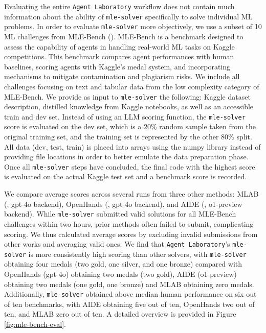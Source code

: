 \documentclass[11pt, a4paper]{gdm_format}
\begin{document}
Evaluating the entire \texttt{Agent Laboratory} workflow does not contain much information about the ability of \texttt{mle-solver} specifically to solve individual ML problems. In order to evaluate \texttt{mle-solver} more objectively, we use a subset of 10 ML challenges from MLE-Bench (\cite{chan2024mle}). MLE-Bench is a benchmark designed to assess the capability of agents in handling real-world ML tasks on Kaggle competitions. This benchmark compares agent performances with human baselines, scoring agents with Kaggle’s medal system, and incorporating mechanisms to mitigate contamination and plagiarism risks. We include all challenges focusing on text and tabular data from the low complexity category of MLE-Bench. We provide as input to \texttt{mle-solver} the following: Kaggle dataset description, distilled knowledge from Kaggle notebooks, as well as an accessible train and dev set. Instead of using an LLM scoring function, the \texttt{mle-solver} score is evaluated on the dev set, which is a 20\% random sample taken from the original training set, and the training set is represented by the other 80\% split. All data (dev, test, train) is placed into arrays using the numpy library instead of providing file locations in order to better emulate the data preparation phase. Once all \texttt{mle-solver} steps have concluded, the final code with the highest score is evaluated on the actual Kaggle test set and a benchmark score is recorded.


We compare average scores across several runs from three other methods: MLAB (\cite{huang2024mlagentbench}, gpt-4o backend), OpenHands (\cite{wang2024opendevin}, gpt-4o backend), and AIDE (\cite{AIDE}, o1-preview backend). While \texttt{mle-solver} submitted valid solutions for all MLE-Bench challenges within two hours, prior methods often failed to submit, complicating scoring. We thus calculated average scores by excluding invalid submissions from other works and averaging valid ones. We find that \texttt{Agent Laboratory}'s \texttt{mle-solver} is more consistently high scoring than other solvers, with \texttt{mle-solver} obtaining four medals (two gold, one silver, and one bronze) compared with OpenHands (gpt-4o) obtaining two medals (two gold), AIDE (o1-preview) obtaining two medals (one gold, one bronze) and MLAB obtaining zero medals. Additionally, \texttt{mle-solver} obtained above median human performance on six out of ten benchmarks, with AIDE obtaining five out of ten, OpenHands two out of ten, and MLAB zero out of ten. A detailed overview is provided in Figure \ref{fig:mle-bench-eval}. 
\end{document}
